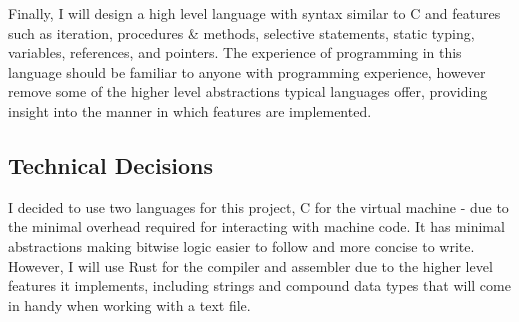 Finally, I will design a high level language with syntax similar to C and features such as iteration, procedures \& methods, selective statements, static typing, variables, references, and pointers. The experience of programming in this language should be familiar to anyone with programming experience, however remove some of the higher level abstractions typical languages offer, providing insight into the manner in which features are implemented. 



\newpage

\newpage



\subsection{Technical Decisions}
I decided to use two languages for this project, C for the virtual machine - due to the minimal overhead required for interacting with machine code. It has minimal abstractions making bitwise logic easier to follow and more concise to write. However, I will use Rust for the compiler and assembler due to the higher level features it implements, including strings and compound data types that will come in handy when working with a text file. 